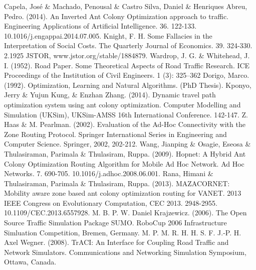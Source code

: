 \documentclass[12pt,conference]{IEEEtran}
\begin{document}
\begin{thebibliography}{1}
 Capela, José \& Machado, Penousal \& Castro Silva, Daniel \& Henriques Abreu, Pedro. (2014). An Inverted Ant Colony Optimization approach to traffic. Engineering Applications of Artificial Intelligence. 36. 122-133. 10.1016/j.engappai.2014.07.005. 
 Knight, F. H. Some Fallacies in the Interpretation of Social Costs. The Quarterly Journal of Economics. 39. 324-330. 2.1925 JSTOR, www.jstor.org/stable/1884879.
 Wardrop, J. G. \& Whitehead, J. I. (1952). Road Paper. Some Theoretical Aspects of Road Traffic Research. ICE Proceedings of the Institution of Civil Engineers. 1 (3): 325–362
 Dorigo, Marco. (1992). Optimization, Learning and Natural Algorithms. (PhD Thesis).
 Kponyo, Jerry \& Yujun Kung, \& Enzhan Zhang. (2014). Dynamic travel path optimization system using ant colony optimization. Computer Modelling and Simulation (UKSim), UKSim-AMSS 16th International Conference. 142-147.
 Z. Haas \& M. Pearlman. (2002). Evaluation of the Ad-Hoc Connectivity with the Zone Routing Protocol. Springer International Series in Engineering and Computer Science. Springer, 2002, 202-212.
 Wang, Jianping \& Osagie, Eseosa \& Thulasiraman, Parimala \& Thulasiram, Ruppa. (2009). Hopnet: A Hybrid Ant Colony Optimization Routing Algorithm for Mobile Ad Hoc Network. Ad Hoc Networks. 7. 690-705. 10.1016/j.adhoc.2008.06.001. 
 Rana, Himani \& Thulasiraman, Parimala \& Thulasiram, Ruppa. (2013). MAZACORNET: Mobility aware zone based ant colony optimization routing for VANET. 2013 IEEE Congress on Evolutionary Computation, CEC 2013. 2948-2955. 10.1109/CEC.2013.6557928. 
 M. B. P. W. Daniel Krajzewicz. (2006). The Open Source Traffic Simulation Package SUMO. RoboCup 2006 Infrastructure Simluation Competition, Bremen, Germany. 
 M. P. M. R. H. H. S. F. J.-P. H. Axel Wegner. (2008). TrACI: An Interface for Coupling Road Traffic and Network Simulators. Communications and Networking Simulation Symposium, Ottawa, Canada. 
\end{thebibliography}
\end{document}
